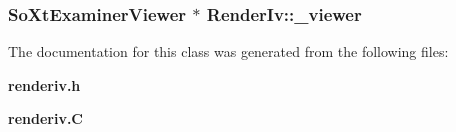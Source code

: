 \subsubsection{\setlength{\rightskip}{0pt plus 5cm}So\-Xt\-Examiner\-Viewer $\ast$ Render\-Iv::\_\-viewer\hspace{0.3cm}{\tt  [protected]}}\label{classRenderIv_n0}




The documentation for this class was generated from the following files:\begin{CompactItemize}
\item 
{\bf renderiv.h}\item 
{\bf renderiv.C}\end{CompactItemize}
